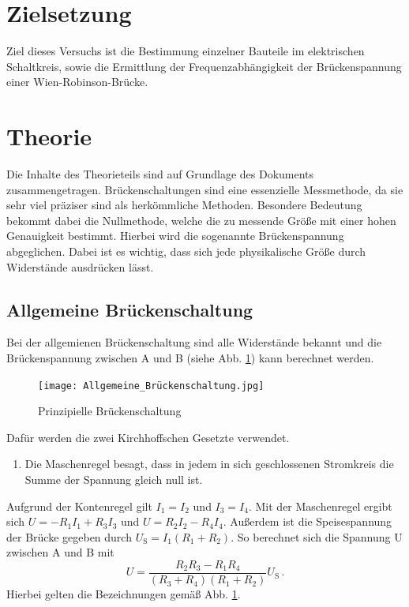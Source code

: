 \section{Zielsetzung}
Ziel dieses Versuchs ist die Bestimmung einzelner Bauteile im elektrischen Schaltkreis,
sowie die Ermittlung der Frequenzabhängigkeit der Brückenspannung einer Wien-Robinson-Brücke.

\section{Theorie}
    \label{sec:Theorie}
    Die Inhalte des Theorieteils sind auf Grundlage des Dokuments \cite{V302_Anleitung} zusammengetragen.
    Brückenschaltungen sind eine essenzielle Messmethode, da sie sehr viel präziser sind als herkömmliche Methoden.
    Besondere Bedeutung bekommt dabei die Nullmethode, welche die zu messende Größe mit einer hohen Genauigkeit bestimmt.
    Hierbei wird die sogenannte Brückenspannung abgeglichen.
    Dabei ist es wichtig, dass sich jede physikalische Größe durch Widerstände ausdrücken lässt.
    \subsection{Allgemeine Brückenschaltung}
    Bei der allgemienen Brückenschaltung sind alle Widerstände bekannt und die Brückenspannung zwischen A und B (siehe
    Abb. \ref{fig:All_Brueckenschaltung}) kann berechnet werden.
    \begin{figure}
        \centering
        \texttt{[image: Allgemeine\_Brückenschaltung.jpg]}
        \caption{Prinzipielle Brückenschaltung}
        \label{fig:All_Brueckenschaltung}
    \end{figure}
    Dafür werden die zwei Kirchhoffschen Gesetzte verwendet.
    \begin{enumerate}
        \item Die Maschenregel besagt, dass in jedem in sich geschlossenen Stromkreis die Summe der Spannung gleich null ist.
    \end{enumerate}
    Aufgrund der Kontenregel gilt $I_1 = I_2$ und $I_3 = I_4$.
    Mit der Maschenregel ergibt sich $U = -R_1 I_1 + R_3 I_3$ und $U = R_2 I_2 - R_4 I_4$.
    Außerdem ist die Speisespannung der Brücke gegeben durch $U_\text{S} = I_1(R_1 + R_2)$.
    So berechnet sich die Spannung U zwischen A und B mit
    \begin{equation}
        U = \frac{R_2 R_3 - R_1 R_4}{(R_3 + R_4)(R_1 + R_2)}U_{\text{S}} \, \text{.}
        \label{eq:Brueckenspannung}
    \end{equation}
    Hierbei gelten die Bezeichnungen gemäß Abb. \ref{fig:All_Brueckenschaltung}.
